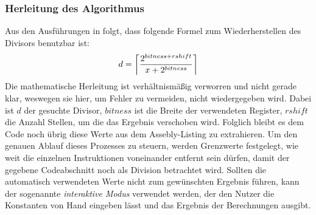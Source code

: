 \documentclass[11pt]{article} %
\DeclarePairedDelimiter\ceil{\lceil}{\rceil}
\begin{document}
\subsubsection{Herleitung des Algorithmus}
Aus den Ausführungen in \cite{stackexchange:4} folgt, dass folgende Formel zum Wiederherstellen
des Divisors benutzbar ist:
\begin{equation*}
	d = \ceil*{\frac{2^{bitness + rshift}}{x + 2^{bitness}}}
\end{equation*}
Die mathematische Herleitung ist verhältnismäßig verworren und nicht gerade klar, weswegen sie hier,
um Fehler zu vermeiden, nicht wiedergegeben wird. Dabei ist $d$ der gesuchte Divisor, $bitness$ ist
die Breite der verwendeten Register, $rshift$ die Anzahl Stellen, um die das Ergebnis verschoben wird.
Folglich bleibt es dem Code noch übrig diese Werte aus dem Assebly-Listing zu extrahieren. Um den
genauen Ablauf dieses Prozesses zu steuern, werden Grenzwerte festgelegt, wie weit die einzelnen
Instruktionen voneinander entfernt sein dürfen, damit der gegebene Codeabschnitt noch als Division
betrachtet wird. Sollten die automatisch verwendeten Werte nicht zum gewünschten Ergebnis führen,
kann der sogenannte \textit{interaktive Modus} verwendet werden, der den Nutzer die Konstanten von
Hand eingeben lässt und das Ergebnis der Berechnungen ausgibt. 
\end{document}
